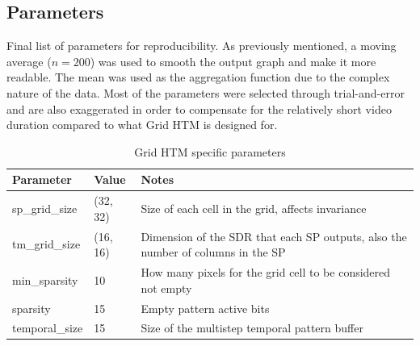 \subsection{Parameters}
Final list of parameters for reproducibility. As previously mentioned, a moving average ($n=200$) was used to smooth the output graph and make it more readable. The mean was used as the aggregation function due to the complex nature of the data. Most of the parameters were selected through trial-and-error and are also exaggerated in order to compensate for the relatively short video duration compared to what Grid HTM is designed for.
\begin{table}[H]
    \centering
    \begin{tabularx}{\linewidth}{@{}XlX@{}}
        \toprule
        \textbf{Parameter} & \textbf{Value} & \textbf{Notes}                                                                  \\
        \midrule
        sp\_grid\_size     & (32, 32)       & Size of each cell in the grid, affects invariance                               \\
        tm\_grid\_size     & (16, 16)       & Dimension of the SDR that each SP outputs, also the number of columns in the SP \\
        min\_sparsity      & 10             & How many pixels for the grid cell to be considered not empty                    \\
        sparsity           & 15             & Empty pattern active bits                                                       \\
        temporal\_size     & 15             & Size of the multistep temporal pattern buffer                                   \\
        \bottomrule
    \end{tabularx}
    \caption{Grid HTM specific parameters}
    \label{tab:surveillance_grid_htm}
\end{table}
